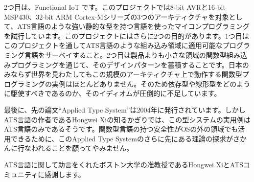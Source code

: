 \documentclass{ipsjprosym}
\begin{document}
2つ目は、Functional IoT \cite{fpiot} です。このプロジェクトでは8-bit AVRと16-bit MSP430、32-bit ARM Cortex-Mシリーズの3つのアーキティクチャを対象として、ATS言語のような強い静的な型を持つ言語を使ったマイコンプログラミングを試行しています。このプロジェクトにはさらに2つの目的があります。1つ目はこのプロジェクトを通してATS言語のような組み込み領域に適用可能なプログラミング言語をサーベイすること。2つ目は製品よりも小さな領域の関数型組み込みプログラミングを通じて、そのデザインパターンを蓄積することです。日本のみならず世界を見わたしてもこの規模のアーキティクチャ上で動作する関数型プログラミングの実例はほとんどありません。そのため依存型や線形型をどのように駆使すべきであるのか、そのイディオムが圧倒的に不足しています。

最後に、先の論文``Applied Type System''は2004年に発行されています。しかしATS言語の作者であるHongwei Xiの知るかぎりでは、この型システムの実用例はATS言語のみであるそうです。関数型言語の持つ安全性がOSの外の領域でも活用できるために、このApplied Type Systemのさらに先にある理論の探求がさかんに行なわれることを願ってやみません。

\begin{acknowledgment}
ATS言語に関して助言をくれたボストン大学の准教授であるHongwei XiとATSコミュニティに感謝します。
\end{acknowledgment}
\end{document}
